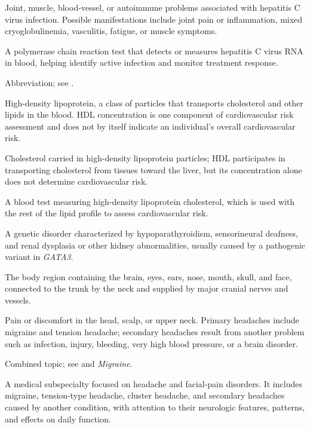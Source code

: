  Joint, muscle, blood-vessel, or autoimmune problems associated with hepatitis C virus infection. Possible manifestations include joint pain or inflammation, mixed cryoglobulinemia, vasculitis, fatigue, or muscle symptoms.

 A polymerase chain reaction test that detects or measures hepatitis C virus RNA in blood, helping identify active infection and monitor treatment response.

 Abbreviation; see .

 High-density lipoprotein, a class of particles that transports cholesterol and other lipids in the blood. HDL
concentration is one component of cardiovascular risk assessment and does not by itself
indicate an individual's overall cardiovascular risk.

 Cholesterol carried in high-density lipoprotein particles; HDL participates in transporting cholesterol from tissues toward the liver, but its concentration alone does not determine cardiovascular risk.

 A blood test measuring high-density lipoprotein cholesterol, which is used with the rest of the lipid profile to assess cardiovascular risk.

 A genetic disorder characterized by hypoparathyroidism, sensorineural deafness, and renal dysplasia or other kidney abnormalities, usually caused by a pathogenic variant in \textit{GATA3}.

 The body region containing the brain, eyes, ears, nose, mouth, skull, and face, connected to the trunk by the neck and supplied by major cranial nerves and vessels.

 Pain or discomfort in the head, scalp, or upper neck. Primary headaches include migraine and tension headache; secondary headaches result from another problem such as infection, injury, bleeding, very high blood pressure, or a brain disorder.

 Combined topic; see  and \textit{Migraine}.

 A medical subspecialty focused on headache and facial-pain disorders. It
includes migraine, tension-type headache, cluster headache, and secondary headaches
caused by another condition, with attention to their neurologic features, patterns, and
effects on daily function.

